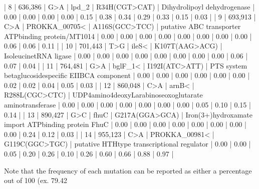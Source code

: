 | 8          | 636,386  | G>A      | lpd_2                      | R34H(CGT>CAT)       | Dihydrolipoyl dehydrogenase                                        | 0.00 | 0.00 | 0.00 | 0.00 | 0.15 | 0.38 | 0.34 | 0.29 | 0.33 | 0.15 | 0.03 |
| 9          | 693,913  | C>A      | PROKKA_00705<              | A116S(GCC>TCC)      | putative ABC transporter ATPbinding protein/MT1014                 | 0.00 | 0.00 | 0.00 | 0.00 | 0.00 | 0.00 | 0.00 | 0.00 | 0.06 | 0.06 | 0.11 |
| 10         | 701,443  | T>G      | ileS<                      | K107T(AAG>ACG)      | IsoleucinetRNA ligase                                              | 0.00 | 0.00 | 0.00 | 0.00 | 0.00 | 0.00 | 0.00 | 0.00 | 0.06 | 0.07 | 0.04 |
| 11         | 764,481  | G>A      | bglF_1<                    | I192I(ATC>ATT)      | PTS system betaglucosidespecific EIIBCA component                  | 0.00 | 0.00 | 0.00 | 0.00 | 0.00 | 0.00 | 0.02 | 0.02 | 0.04 | 0.05 | 0.03 |
| 12         | 860,048  | C>A      | arnB<                      | R288L(CGC>CTC)      | UDP4amino4deoxyLarabinoseoxoglutarate aminotransferase             | 0.00 | 0.00 | 0.00 | 0.00 | 0.00 | 0.00 | 0.00 | 0.05 | 0.10 | 0.15 | 0.14 |
| 13         | 890,427  | G>C      | fhuC                       | G217A(GGA>GCA)      | Iron(3+)hydroxamate import ATPbinding protein FhuC                 | 0.00 | 0.00 | 0.00 | 0.00 | 0.00 | 0.00 | 0.00 | 0.00 | 0.24 | 0.12 | 0.03 |
| 14         | 955,123  | C>A      | PROKKA_00981<              | G119C(GGC>TGC)      | putative HTHtype transcriptional regulator                         | 0.00 | 0.00 | 0.05 | 0.20 | 0.26 | 0.10 | 0.26 | 0.60 | 0.66 | 0.88 | 0.97 |

Note that the frequency of each mutation can be reported as either a percentage out of 100 (ex. 79.42%
